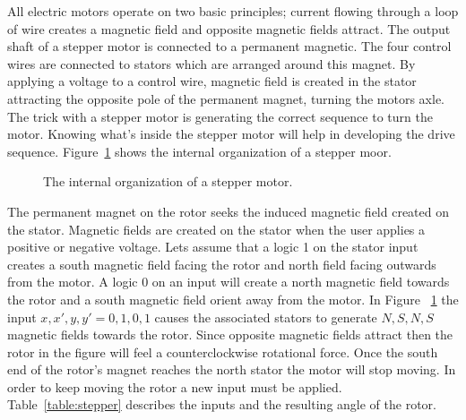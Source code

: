                             All electric motors operate on two basic principles;
                            current flowing through a loop of wire creates a magnetic
                            field and opposite magnetic fields attract.
                            The output shaft of a stepper motor is connected to a permanent
                            magnetic.  The four control wires are connected to stators which
                            are arranged around this magnet.  By applying a voltage to a
                            control wire, magnetic field is created in the stator
                            attracting the opposite pole of the permanent magnet, turning
                            the motors axle.  The trick with a stepper motor is generating
                            the correct sequence to turn the motor.  Knowing what's inside
                            the stepper motor will help in developing the drive sequence.
                            Figure~\ref{fig:commonPeripheralComponentsstepper} shows the internal organization of a
                            stepper moor.

                            \begin{figure}[ht]
                                \caption{The internal organization of a stepper motor.}
                                \label{fig:commonPeripheralComponentsstepper}
                            \end{figure}

                            The permanent magnet on the rotor seeks the induced magnetic field
                            created on the stator.  Magnetic fields are created on the stator
                            when the user applies a positive or negative voltage.  Lets assume
                            that a logic 1 on the stator input creates a south magnetic field facing the rotor
                            and north field facing outwards from the motor.  A logic 0 on an input
                            will create a north magnetic field towards the rotor and a south magnetic
                            field orient away from the motor.  In Figure ~\ref{fig:commonPeripheralComponentsstepper}
                            the input $x,x',y,y' = 0,1,0,1$ causes the associated stators to generate
                            $N,S,N,S$ magnetic fields towards the rotor.  Since opposite magnetic
                            fields attract then the rotor in the figure will feel a counterclockwise
                            rotational force.  Once the south end of the rotor's magnet reaches the
                            north stator the motor will stop moving.  In order to keep moving
                            the rotor a new input must be applied.  Table~\ref{table:stepper}
                            describes the inputs and the resulting angle of the rotor.

